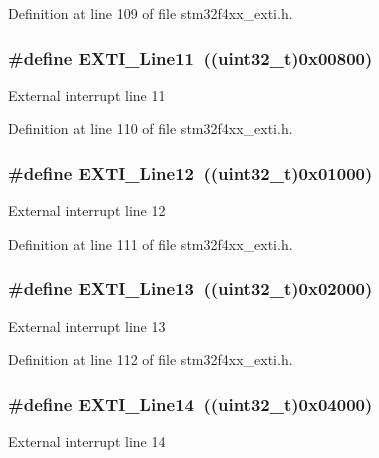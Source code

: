 Definition at line 109 of file stm32f4xx\-\_\-exti.\-h.

\hypertarget{group___e_x_t_i___lines_ga6157b34c53e9b5cb8ee0d7ac3f5ba292}{
\subsubsection[{E\-X\-T\-I\-\_\-\-Line11}]{\setlength{\rightskip}{0pt plus 5cm}\#define E\-X\-T\-I\-\_\-\-Line11~((uint32\-\_\-t)0x00800)}}\label{group___e_x_t_i___lines_ga6157b34c53e9b5cb8ee0d7ac3f5ba292}
External interrupt line 11 

Definition at line 110 of file stm32f4xx\-\_\-exti.\-h.

\hypertarget{group___e_x_t_i___lines_gab73a0a31f1814118955099b9dd3bdfef}{
\subsubsection[{E\-X\-T\-I\-\_\-\-Line12}]{\setlength{\rightskip}{0pt plus 5cm}\#define E\-X\-T\-I\-\_\-\-Line12~((uint32\-\_\-t)0x01000)}}\label{group___e_x_t_i___lines_gab73a0a31f1814118955099b9dd3bdfef}
External interrupt line 12 

Definition at line 111 of file stm32f4xx\-\_\-exti.\-h.

\hypertarget{group___e_x_t_i___lines_gae382388ac34b78917a7bd06562e35c42}{
\subsubsection[{E\-X\-T\-I\-\_\-\-Line13}]{\setlength{\rightskip}{0pt plus 5cm}\#define E\-X\-T\-I\-\_\-\-Line13~((uint32\-\_\-t)0x02000)}}\label{group___e_x_t_i___lines_gae382388ac34b78917a7bd06562e35c42}
External interrupt line 13 

Definition at line 112 of file stm32f4xx\-\_\-exti.\-h.

\hypertarget{group___e_x_t_i___lines_ga7b3821ad1b7a00b49c27075688f48101}{
\subsubsection[{E\-X\-T\-I\-\_\-\-Line14}]{\setlength{\rightskip}{0pt plus 5cm}\#define E\-X\-T\-I\-\_\-\-Line14~((uint32\-\_\-t)0x04000)}}\label{group___e_x_t_i___lines_ga7b3821ad1b7a00b49c27075688f48101}
External interrupt line 14 

